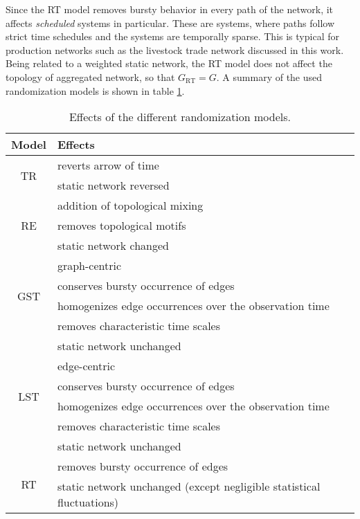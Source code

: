 Since the RT model removes bursty behavior in every path of the network, it affects \emph{scheduled} systems in particular.
These are systems, where paths follow strict time schedules and the systems are temporally sparse.
This is typical for production networks such as the livestock trade network discussed in this work.
Being related to a weighted static network, the RT model does not affect the topology of aggregated network, so that $G_\mathrm{RT}=G$.
%
A summary of the used randomization models is shown in table \ref{tab:random_models}.
\begin{table}[htb]
\sffamily
\begin{center}%
\caption{Effects of the different randomization models.
}
\begin{tabular*}{\hsize}{@{\extracolsep{\fill}}cl}
\hline
Model & Effects\\
\hline \hline
\multirow{2}{*}{TR} & reverts arrow of time\\
& static network reversed\\
\hline
\multirow{3}{*}{RE} & addition of topological mixing\\
& removes topological motifs\\
& static network changed\\
\hline
\multirow{4}{*}{GST} & graph-centric\\
&conserves bursty occurrence of edges\\
& homogenizes edge occurrences over the observation time\\
& removes characteristic time scales\\
& static network unchanged\\
%
\hline
\multirow{4}{*}{LST} & edge-centric \\
& conserves bursty occurrence of edges\\
& homogenizes edge occurrences over the observation time\\
& removes characteristic time scales\\
& static network unchanged\\
%
\hline
\multirow{2}{*}{RT} & removes bursty occurrence of edges\\
& static network unchanged (except negligible statistical fluctuations)\\
\hline \hline
\end{tabular*}
\label{tab:random_models}
\end{center}
\end{table}



